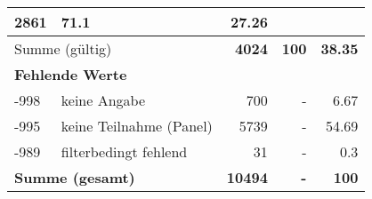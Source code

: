 \begin{longtable}{lXrrr}
       \num{2861} &
       \num[round-mode=places,round-precision=2]{71.1} &
         \num[round-mode=places,round-precision=2]{27.26} \\
     \midrule
     \multicolumn{2}{l}{Summe (gültig)} &
       \textbf{\num{4024}} &
     \textbf{\num{100}} &
       \textbf{\num[round-mode=places,round-precision=2]{38.35}} \\
     \multicolumn{5}{l}{\textbf{Fehlende Werte}}\\
       -998 &
       keine Angabe &
         \num{700} &
        - &
         \num[round-mode=places,round-precision=2]{6.67} \\
       -995 &
       keine Teilnahme (Panel) &
         \num{5739} &
        - &
         \num[round-mode=places,round-precision=2]{54.69} \\
       -989 &
       filterbedingt fehlend &
         \num{31} &
        - &
         \num[round-mode=places,round-precision=2]{0.3} \\
     \midrule
     \multicolumn{2}{l}{\textbf{Summe (gesamt)}} &
          \textbf{\num{10494}} &
        \textbf{-} &
        \textbf{\num{100}} \\
     \bottomrule
     \end{longtable}
     
